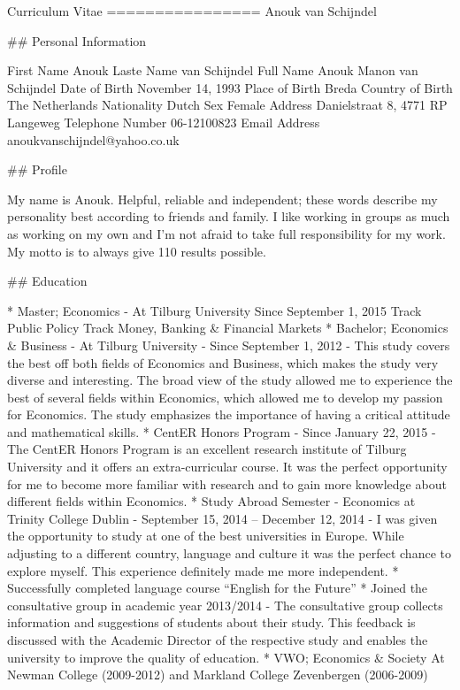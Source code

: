 
Curriculum Vitae
================
Anouk van Schijndel

## Personal Information

First Name			Anouk
Laste Name			van Schijndel
Full Name			Anouk Manon van Schijndel
Date of Birth		November 14, 1993
Place of Birth		Breda
Country of Birth	The Netherlands
Nationality			Dutch
Sex					Female
Address				Danielstraat 8, 4771 RP Langeweg
Telephone Number	06-12100823
Email Address		anoukvanschijndel@yahoo.co.uk

## Profile

My name is Anouk. Helpful, reliable and independent; these words describe my personality best
according to friends and family. I like working in groups as much as working on my own and I’m not
afraid to take full responsibility for my work. My motto is to always give 110%
results possible.

## Education

* Master; Economics
	- At Tilburg University
	Since September 1, 2015
	Track Public Policy
	Track Money, Banking & Financial Markets
* Bachelor; Economics & Business
	- At Tilburg University
	- Since September 1, 2012
	- This study covers the best off both fields of Economics and Business, which makes the study very diverse and interesting. The broad view of the study allowed me to experience the best of several fields within Economics, which allowed me to develop my passion for Economics. The study emphasizes the importance of having a critical attitude and mathematical skills.
	* CentER Honors Program
		- Since January 22, 2015
		- The CentER Honors Program is an excellent research institute of Tilburg University and it offers an extra-curricular course. It was the perfect opportunity for me to become more familiar with research and to gain more knowledge about different fields within Economics.
	* Study Abroad Semester
		- Economics at Trinity College Dublin
		- September 15, 2014 – December 12, 2014
		- I was given the opportunity to study at one of the best universities in Europe. While adjusting to a different country, language and culture it was the perfect chance to explore myself. This experience definitely made me more independent.
	* Successfully completed language course “English for the Future”
	* Joined the consultative group in academic year 2013/2014
		- The consultative group collects information and suggestions of students about their study. This feedback is discussed with the Academic Director of the respective study and enables the university to improve the quality of education.
* VWO; Economics & Society
At Newman College (2009-2012) and Markland College Zevenbergen (2006-2009)

